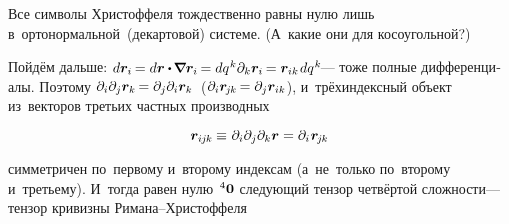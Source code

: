 \begin{otherlanguage}{russian}
Все символы Христоффеля тождественно равны нулю лишь в~ортонормальной~(декартовой) системе. (А~какие они для косоугольной?)

Пойдём дальше: ${d\bm{r}_i \hspace{-0.2ex} = d\bm{r} \dotp \hspace{-0.2ex} \boldnabla \bm{r}_i \hspace{-0.2ex} = dq^{\hspace{.1ex}k} \partial_k \bm{r}_i \hspace{-0.2ex} = \bm{r}_{ik} \hspace{0.2ex} dq^{\hspace{.1ex}k}\hspace{-0.25ex}}$\:--- тоже полные дифференциалы.
Поэтому ${\partial_i \partial_j \bm{r}_k \hspace{-0.2ex} = \partial_j \partial_i \bm{r}_k}$~(${\partial_i \bm{r}_{\hspace{-0.2ex}j\hspace{-0.1ex}k} \hspace{-0.2ex} = \partial_j \bm{r}_{ik}}$),
и~трёхиндексный объект из~векторов третьих частных производных

\nopagebreak\vspace{-0.25em}
\begin{equation}
\bm{r}_{i\hspace{-0.1ex}j\hspace{-0.1ex}k} \hspace{-0.1ex} \equiv \hspace{.1ex} \partial_i \partial_j \partial_k \bm{r}
= \partial_i \hspace{.12ex} \bm{r}_{\hspace{-0.2ex}j\hspace{-0.1ex}k} %
\end{equation}

\vspace{-0.24em} \noindent симметричен по~первому и~второму индексам (а~не~только по~второму и~третьему). И~тогда равен нулю~${\hspace{-0.16ex}^4\bm{0}}$ следующий тензор четвёртой сложности\:--- тензор кривизны Римана\hbox{--}Христоффеля


\end{otherlanguage}
